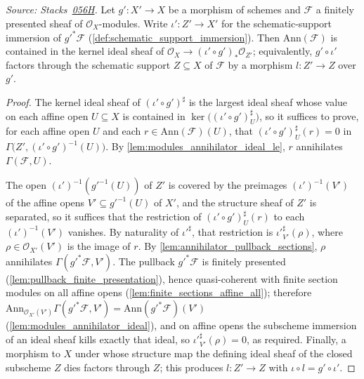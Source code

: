 \begin{lemma}\leanok
  \label{lem:annihilator_le_map_pullback}
  \textit{Source:
  Stacks~\href{https://stacks.math.columbia.edu/tag/056H}{056H}.}
  Let \(g' : X' \to X\) be a morphism of schemes and \(\mathcal{F}\) a
  finitely presented sheaf of \(\mathcal{O}_X\)-modules.  Write
  \(\iota' : Z' \to X'\) for the schematic-support immersion of
  \(g'^* \mathcal{F}\) (\cref{def:schematic_support_immersion}).  Then
  \(\mathrm{Ann}(\mathcal{F})\) is contained in the kernel ideal sheaf of
  \(\mathcal{O}_X \to (\iota' \circ g')_* \mathcal{O}_{Z'}\); equivalently,
  \(g' \circ \iota'\) factors through the schematic support
  \(Z \subseteq X\) of \(\mathcal{F}\) by a morphism \(l : Z' \to Z\) over
  \(g'\).
\end{lemma}
\begin{proof}\leanok
  The kernel ideal sheaf of \((\iota' \circ g')^\sharp\) is the largest ideal
  sheaf whose value on each affine open \(U \subseteq X\) is contained in
  \(\ker\bigl((\iota' \circ g')^\sharp_U\bigr)\), so it suffices to prove,
  for each affine open \(U\) and each \(r \in \mathrm{Ann}(\mathcal{F})(U)\),
  that \((\iota' \circ g')^\sharp_U(r) = 0\) in
  \(\Gamma\bigl(Z', (\iota' \circ g')^{-1}(U)\bigr)\).  By
  \cref{lem:modules_annihilator_ideal_le}, \(r\) annihilates
  \(\Gamma(\mathcal{F}, U)\).

  The open \((\iota')^{-1}(g'^{-1}(U))\) of \(Z'\) is covered by the
  preimages \((\iota')^{-1}(V')\) of the affine opens
  \(V' \subseteq g'^{-1}(U)\) of \(X'\), and the structure sheaf of \(Z'\) is
  separated, so it suffices that the restriction of
  \((\iota' \circ g')^\sharp_U(r)\) to each \((\iota')^{-1}(V')\) vanishes.
  By naturality of \(\iota'^\sharp\), that restriction is
  \(\iota'^\sharp_{V'}(\rho)\), where \(\rho \in \mathcal{O}_{X'}(V')\) is the
  image of \(r\).  By \cref{lem:annihilator_pullback_sections}, \(\rho\)
  annihilates \(\Gamma(g'^* \mathcal{F}, V')\).  The pullback
  \(g'^* \mathcal{F}\) is finitely presented
  (\cref{lem:pullback_finite_presentation}), hence quasi-coherent with finite
  section modules on all affine opens
  (\cref{lem:finite_sections_affine_all}); therefore
  \(\mathrm{Ann}_{\mathcal{O}_{X'}(V')}\Gamma(g'^* \mathcal{F}, V')
  = \mathrm{Ann}(g'^* \mathcal{F})(V')\)
  (\cref{lem:modules_annihilator_ideal}), and on affine opens the subscheme
  immersion of an ideal sheaf kills exactly that ideal, so
  \(\iota'^\sharp_{V'}(\rho) = 0\), as required.  Finally, a morphism to
  \(X\) under whose structure map the defining ideal sheaf of the closed
  subscheme \(Z\) dies factors through \(Z\); this produces \(l : Z' \to Z\)
  with \(\iota \circ l = g' \circ \iota'\).
\end{proof}

